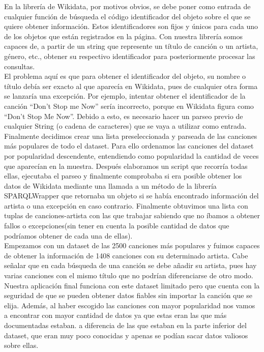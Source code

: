 En la librería de Wikidata, por motivos obvios, se debe poner como entrada de cualquier función de búsqueda el código identificador del objeto sobre el que se quiere obtener información. Estos identificadores son fijos y únicos para cada uno de los objetos que están registrados en la página. Con nuestra librería somos capaces de, a partir de un string que represente un título de canción o un artista, género, etc., obtener su respectivo identificador para posteriormente procesar las consultas.\\

El problema aquí es que para obtener el identificador del objeto, su nombre o título debía ser exacto al que aparecía en Wikidata, pues de cualquier otra forma se lanzaría una excepción. Por ejemplo, intentar obtener el identificador de la canción ``Don’t Stop me Now'' sería incorrecto, porque en Wikidata figura como ``Don’t Stop Me Now''. Debido a esto, es necesario hacer un parseo previo de cualquier String (o cadena de caracteres) que se vaya a utilizar como entrada.\\

Finalmente decidimos crear una lista preseleccionada y parseada de las canciones más populares de todo el dataset. Para ello ordenamos las canciones del dataset por popularidad descendente, entendiendo como popularidad la cantidad de veces que aparecían en la muestra. Después elaboramos un script que recorría todas ellas, ejecutaba el parseo y finalmente comprobaba si era posible obtener los datos de Wikidata mediante una llamada a un método de la librería SPARQLWrapper que retornaba un objeto si se había encontrado información del artista o una excepción en caso contrario. Finalmente obtuvimos una lista con tuplas de canciones-artista con las que trabajar sabiendo que no íbamos a obtener fallos o excepciones(sin tener en cuenta la posible cantidad de datos que podríamos obtener de cada una de ellas).\\

Empezamos con un dataset de las 2500 canciones más populares y fuimos capaces de obtener la información de 1408 canciones con su determinado artista. Cabe señalar que en cada búsqueda de una canción se debe añadir su artista, pues hay varias canciones con el mismo título que no podrían diferenciarse de otro modo.\\

Nuestra aplicación final funciona con este dataset limitado pero que cuenta con la seguridad de que se pueden obtener datos fiables sin importar la canción que se elija. Además, al haber escogido las canciones con mayor popularidad nos vamos a encontrar con mayor cantidad de datos ya que estas eran las que más documentadas estaban. a diferencia de las que estaban en la parte inferior del dataset, que eran muy poco conocidas y apenas se podían sacar datos valiosos sobre ellas.


